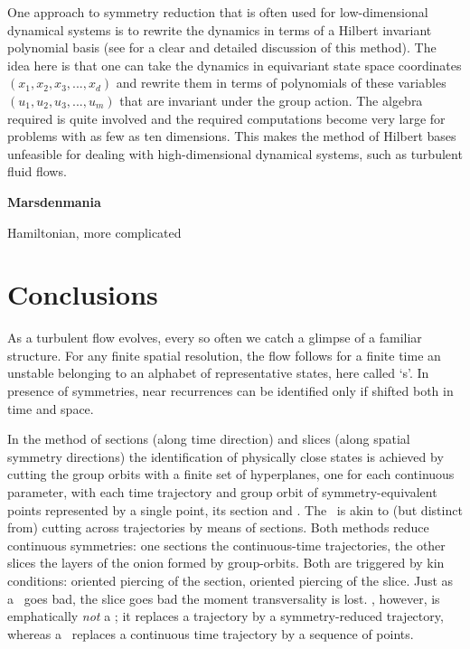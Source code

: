 \documentclass[aip,cha,reprint,
secnumarabic,
nofootinbib, tightenlines,
nobibnotes, showkeys, showpacs,
]{revtex4-1}
\begin{document}
{%
One approach to symmetry reduction that is often used for low-dimensional
dynamical systems is to rewrite the dynamics in terms of a Hilbert
invariant polynomial basis (see  for a clear and
detailed discussion of this method). The idea here is that one can take
the dynamics in equivariant state space coordinates
$(x_1,x_2,x_3,...,x_d)$ and rewrite them in terms of polynomials of these
variables $(u_1,u_2,u_3,...,u_m)$ that are invariant under the group
action. The algebra required is quite involved and the required
computations become very large for problems with as few as ten
dimensions. This makes the method of Hilbert bases
unfeasible for dealing with high-dimensional dynamical systems, such
as turbulent fluid flows.

{\bf Marsdenmania}

Hamiltonian, more complicated

    \color{black}\fi


\section{Conclusions}
\label{s:concl}

As a turbulent flow evolves, every so often we catch a glimpse of a
familiar structure. For any finite spatial resolution, the flow follows
for a finite time an unstable {\cohStr} belonging to an alphabet of
representative states, here called `\template s'. In presence of
symmetries, near recurrences can be identified only if shifted both in
time and space.

In the method of sections (along time direction) and slices (along
spatial symmetry directions) the identification of physically close
states is achieved by cutting the group orbits with a finite set of
hyperplanes, one for each continuous parameter, with each time trajectory
and group orbit of symmetry-equivalent points represented by a single
point, its  section and \slice.
The \mslices\ is akin to (but distinct from) cutting across trajectories
by means of sections. Both methods reduce continuous symmetries: one
sections the continuous-time trajectories, the other slices the layers of
the onion formed by group-orbits. Both are triggered by kin
conditions: oriented piercing of the section, oriented piercing of the slice. Just
as a \PoincSec\ goes bad, the slice goes bad the moment transversality is
lost. \Slice, however, is emphatically \emph{not} a \PoincSec; it
replaces a trajectory by a symmetry-reduced trajectory, whereas a
\PoincSec\ replaces a continuous time trajectory by a sequence of points.

}
\end{document}
